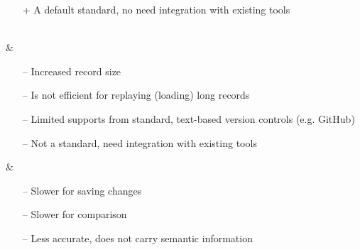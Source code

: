\begin{table*}[h]
\begin{scriptsize}
\begin{tabular}
\begin{minipage}[t]{5cm}
\begin{itemize}[leftmargin=9pt]
          \item[+] A default standard, no need integration with existing tools \cite{koegel2010emfstore}  
        \end{itemize}
      \end{minipage}
      \\
      \hline
       & \begin{minipage}[t]{5cm}
        \raggedright
        \begin{itemize}[leftmargin=9pt]
          \setlength\itemsep{2pt}
          \item[--] Increased record size \cite{DBLP:journals/entcs/RobbesL07,DBLP:conf/edoc/KoegelHLHD10}
          \item[--] Is not efficient for replaying (loading) long records \cite{mens2002state}
          \item[--] Limited supports from standard, text-based version controls (e.g. GitHub) \cite{koegel2010emfstore} 
          \item[--] Not a standard, need integration with existing tools \cite{koegel2010emfstore} 
        \end{itemize}
      \end{minipage}
      & 
      \begin{minipage}[t]{5cm}
        \raggedright
        \begin{itemize}[leftmargin=9pt]
          \setlength\itemsep{2pt}
          \item[--] Slower for saving changes  \cite{mens2002state,daniel2016neoemf,DBLP:conf/models/Espinazo-PaganCM11}
          \item[--] Slower for comparison \cite{DBLP:conf/edoc/KoegelHLHD10}
          \item[--] Less accurate, does not carry semantic information \cite{mens2002state,DBLP:conf/edoc/KoegelHLHD10}  
        \end{itemize}
      \end{minipage}
      \\
      \hline
    \end{tabular} 
  \end{scriptsize}
\end{table*}

